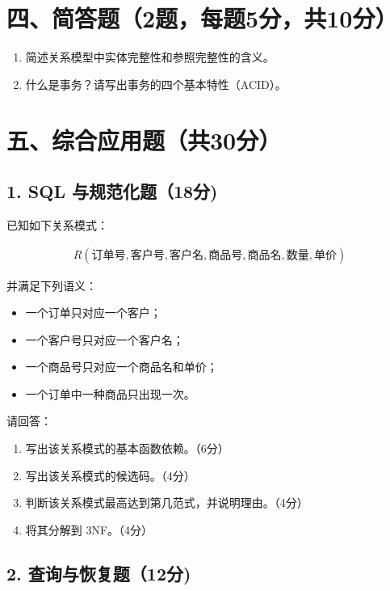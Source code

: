 \documentclass{../../note}
\begin{document}
\section*{四、简答题（2题，每题5分，共10分）}

\begin{enumerate}[itemsep=1em]
\item 简述关系模型中实体完整性和参照完整性的含义。
\item 什么是事务？请写出事务的四个基本特性（ACID）。
\end{enumerate}

\section*{五、综合应用题（共30分）}

\subsection*{1. SQL 与规范化题（18分)}

已知如下关系模式：

\begin{align*}
R(\text{订单号}, \text{客户号}, \text{客户名}, \text{商品号}, \text{商品名}, \text{数量}, \text{单价})
\end{align*}

并满足下列语义：

\begin{itemize}[itemsep=0.4em]
\item 一个订单只对应一个客户；
\item 一个客户号只对应一个客户名；
\item 一个商品号只对应一个商品名和单价；
\item 一个订单中一种商品只出现一次。
\end{itemize}

请回答：

\begin{enumerate}[label=(\arabic*), itemsep=0.8em]
\item 写出该关系模式的基本函数依赖。（6分）
\item 写出该关系模式的候选码。（4分）
\item 判断该关系模式最高达到第几范式，并说明理由。（4分）
\item 将其分解到 3NF。（4分）
\end{enumerate}

\subsection*{2. 查询与恢复题（12分)}
\end{document}
